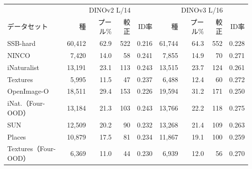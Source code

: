 {\fontsize{6.5pt}{7.6pt}\selectfont\renewcommand{\arraystretch}{1.0}%
\setlength{\tabcolsep}{2.8pt}\begin{tabular}{@{}l|rrrr|rrrr@{}}
\hline
\rule[-2.0pt]{0pt}{8.2pt} & \multicolumn{4}{c|}{DINOv2 L/14} & \multicolumn{4}{c}{DINOv3 L/16} \\
\rule[-2.0pt]{0pt}{8.2pt}データセット & 種 & プール\% & 較正 & ID率 & 種 & プール\% & 較正 & ID率 \\
\hline
SSB-hard & 60,412 & 62.9 & 522 & 0.216 & 61,744 & 64.3 & 552 & 0.228 \\
NINCO & 7,420 & 14.0 & 58 & 0.241 & 7,855 & 14.9 & 70 & 0.271 \\
iNaturalist & 13,191 & 23.1 & 113 & 0.243 & 13,515 & 23.7 & 124 & 0.261 \\
Textures & 5,995 & 11.5 & 47 & 0.237 & 6,488 & 12.4 & 60 & 0.272 \\
OpenImage-O & 18,511 & 29.4 & 153 & 0.226 & 19,594 & 31.2 & 171 & 0.250 \\
iNat.（Four-OOD） & 13,184 & 21.3 & 103 & 0.243 & 13,766 & 22.2 & 118 & 0.275 \\
SUN & 12,509 & 20.2 & 90 & 0.232 & 13,268 & 21.4 & 109 & 0.263 \\
Places & 10,879 & 17.5 & 81 & 0.234 & 11,867 & 19.1 & 100 & 0.259 \\
Textures（Four-OOD） & 6,369 & 11.0 & 44 & 0.230 & 6,939 & 12.0 & 56 & 0.270 \\
\hline
\end{tabular}}%
